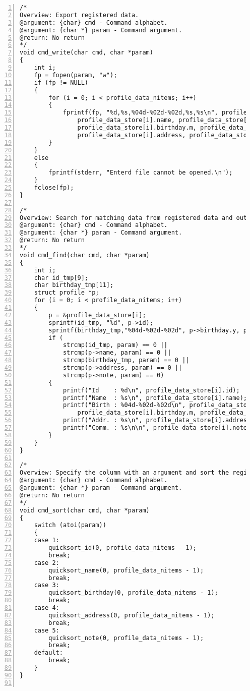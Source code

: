 \documentclass[autodetect-engine,dvi=dvipdfmx,ja=standard,
               a4j,11pt]{bxjsarticle}
\begin{document}
\begin{Verbatim}[numbers=left, xleftmargin=10mm, numbersep=6pt,
    fontsize=\small, baselinestretch=0.8]
/*
Overview: Export registered data.
@argument: {char} cmd - Command alphabet.
@argument: {char *} param - Command argument.
@return: No return
*/
void cmd_write(char cmd, char *param)
{
    int i;
    fp = fopen(param, "w");
    if (fp != NULL)
    {
        for (i = 0; i < profile_data_nitems; i++)
        {
            fprintf(fp, "%d,%s,%04d-%02d-%02d,%s,%s\n", profile_data_store[i].id,
                profile_data_store[i].name, profile_data_store[i].birthday.y,
                profile_data_store[i].birthday.m, profile_data_store[i].birthday.d,
                profile_data_store[i].address, profile_data_store[i].note);
        }
    }
    else
    {
        fprintf(stderr, "Enterd file cannot be opened.\n");
    }
    fclose(fp);
}

/*
Overview: Search for matching data from registered data and output.
@argument: {char} cmd - Command alphabet.
@argument: {char *} param - Command argument.
@return: No return
*/
void cmd_find(char cmd, char *param)
{
    int i;
    char id_tmp[9];
    char birthday_tmp[11];
    struct profile *p;
    for (i = 0; i < profile_data_nitems; i++)
    {
        p = &profile_data_store[i];
        sprintf(id_tmp, "%d", p->id);
        sprintf(birthday_tmp,"%04d-%02d-%02d", p->birthday.y, p->birthday.m, p->birthday.d);
        if (
            strcmp(id_tmp, param) == 0 ||
            strcmp(p->name, param) == 0 ||
            strcmp(birthday_tmp, param) == 0 ||
            strcmp(p->address, param) == 0 ||
            strcmp(p->note, param) == 0)
        {
            printf("Id    : %d\n", profile_data_store[i].id);
            printf("Name  : %s\n", profile_data_store[i].name);
            printf("Birth : %04d-%02d-%02d\n", profile_data_store[i].birthday.y,
                profile_data_store[i].birthday.m, profile_data_store[i].birthday.d);
            printf("Addr. : %s\n", profile_data_store[i].address);
            printf("Comm. : %s\n\n", profile_data_store[i].note);
        }
    }
}

/*
Overview: Specify the column with an argument and sort the registered data.
@argument: {char} cmd - Command alphabet.
@argument: {char *} param - Command argument.
@return: No return
*/
void cmd_sort(char cmd, char *param)
{
    switch (atoi(param))
    {
    case 1:
        quicksort_id(0, profile_data_nitems - 1);
        break;
    case 2:
        quicksort_name(0, profile_data_nitems - 1);
        break;
    case 3:
        quicksort_birthday(0, profile_data_nitems - 1);
        break;
    case 4:
        quicksort_address(0, profile_data_nitems - 1);
        break;
    case 5:
        quicksort_note(0, profile_data_nitems - 1);
        break;
    default:
        break;
    }
}


\end{Verbatim}
\end{document}
